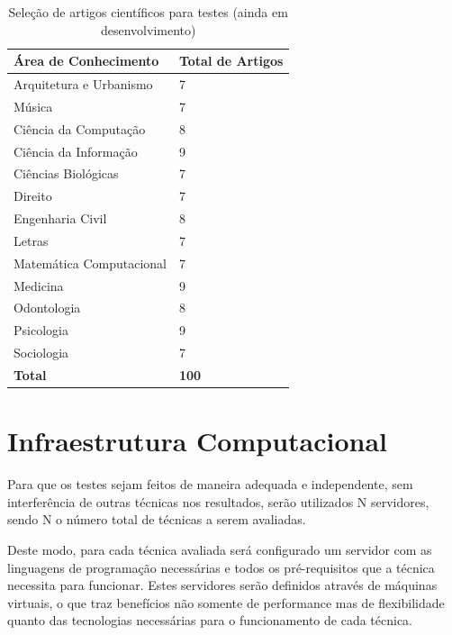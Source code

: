 \begin{table}
    \caption{Seleção de artigos científicos para testes (ainda em desenvolvimento)}
    \begin{center}
        \begin{tabular}{|l|l|}
        	\hline
            \textbf{Área de Conhecimento} & \textbf{Total de Artigos} \\ 
            \hline
            Arquitetura e Urbanismo & 7 \\ 
			Música & 7 \\ 
			Ciência da Computação & 8 \\
			Ciência da Informação & 9 \\
            Ciências Biológicas & 7 \\
            Direito & 7 \\
            Engenharia Civil & 8 \\
            Letras & 7 \\
            Matemática Computacional & 7 \\
            Medicina & 9 \\ 
            Odontologia & 8 \\ 
            Psicologia & 9 \\
            Sociologia & 7 \\	
            \hline
            \textbf{Total} & \textbf{100} \\
            \hline 
        \end{tabular}
    \end{center}
    \label{tab:papers-list}
\end{table}

\section{Infraestrutura Computacional}
\label{sec:computational-structure}

Para que os testes sejam feitos de maneira adequada e independente, sem interferência de outras técnicas nos resultados, serão utilizados N servidores, sendo N o número total de técnicas a serem avaliadas.

Deste modo, para cada técnica avaliada será configurado um servidor com as linguagens de programação necessárias e todos os pré-requisitos que a técnica necessita para funcionar. Estes servidores serão definidos através de máquinas virtuais, o que traz benefícios não somente de performance mas de flexibilidade quanto das tecnologias necessárias para o funcionamento de cada técnica.

